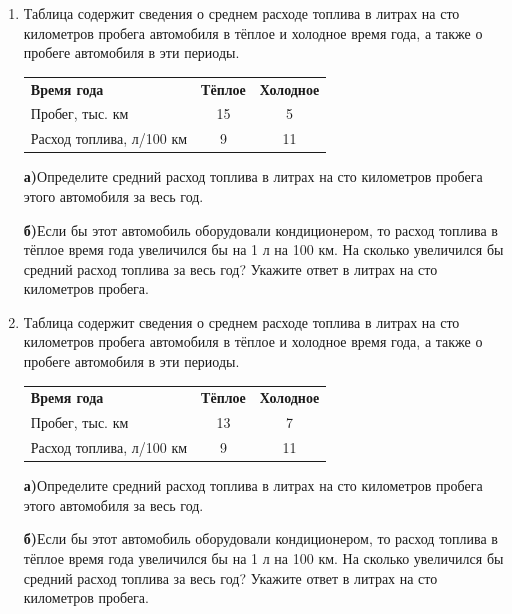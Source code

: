 \documentclass[a4paper,12pt]{article}
\newcommand{\taskspace}{\par\vspace{0.42cm}}
\newcommand{\subtask}[2]{\par\medskip\textbf{#1}\enspace #2\par\vspace{0.22cm}}
\begin{document}
\begin{enumerate}[resume]
\item Таблица содержит сведения о среднем расходе топлива в литрах на сто километров пробега автомобиля в тёплое и холодное время года, а также о пробеге автомобиля в эти периоды.
\begin{center}
\renewcommand{\arraystretch}{1.22}
\begin{tabular}{@{}lcc@{}}\textbf{Время года} & \textbf{Тёплое} & \textbf{Холодное} \\
Пробег, тыс. км & 15 & 5 \\
Расход топлива, л/100 км & 9 & 11\end{tabular}
\end{center}
\subtask{а)}{Определите средний расход топлива в литрах на сто километров пробега этого автомобиля за весь год.}
\subtask{б)}{Если бы этот автомобиль оборудовали кондиционером, то расход топлива в тёплое время года увеличился бы на 1 л на 100 км. На сколько увеличился бы средний расход топлива за весь год? Укажите ответ в литрах на сто километров пробега.}

\taskspace

\item Таблица содержит сведения о среднем расходе топлива в литрах на сто километров пробега автомобиля в тёплое и холодное время года, а также о пробеге автомобиля в эти периоды.
\begin{center}
\renewcommand{\arraystretch}{1.22}
\begin{tabular}{@{}lcc@{}}\textbf{Время года} & \textbf{Тёплое} & \textbf{Холодное} \\
Пробег, тыс. км & 13 & 7 \\
Расход топлива, л/100 км & 9 & 11\end{tabular}
\end{center}
\subtask{а)}{Определите средний расход топлива в литрах на сто километров пробега этого автомобиля за весь год.}
\subtask{б)}{Если бы этот автомобиль оборудовали кондиционером, то расход топлива в тёплое время года увеличился бы на 1 л на 100 км. На сколько увеличился бы средний расход топлива за весь год? Укажите ответ в литрах на сто километров пробега.}

\taskspace


\end{enumerate}
\end{document}
